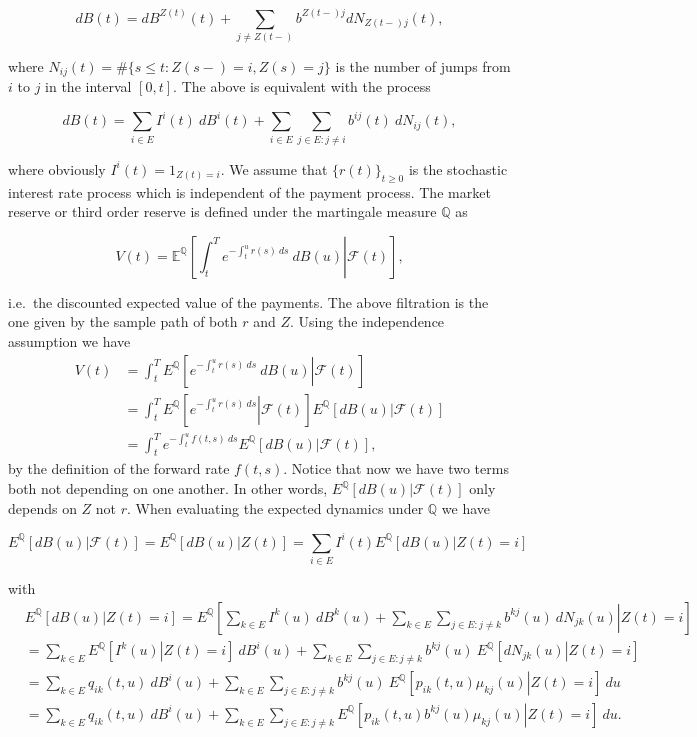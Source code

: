 \documentclass[a4paper,12pt,openany]{book}
\begin{document}
\[
dB(t)=dB^{Z(t)}(t)+\sum_{j\ne Z(t-)}b^{Z(t-)j}dN_{Z(t-)j}(t),
\]

where \(N_{ij}(t)=\#\{s\le t:Z(s-)=i,Z(s)=j\}\) is the number of jumps from \(i\) to \(j\)
in the interval \([0,t]\). The above is equivalent with the process

\[
dB(t)=\sum_{i\in E}I^i(t)\ dB^i(t)+\sum_{i\in E}\sum_{j\in E : j\ne i}b^{ij}(t)\ dN_{ij}(t),
\]

where obviously \(I^i(t)=1_{Z(t)=i}\). We assume that \(\{r(t)\}_{t\ge 0}\) is the stochastic interest rate process which is independent of the payment process. The market reserve or third order reserve is defined under the martingale measure \(\mathbb Q\) as

\[
V(t)=\mathbb E^{\mathbb Q}\left[\left.\int_t^Te^{-\int_t^ur(s)\ ds}\ dB(u)\right\vert \mathcal F(t)\right],
\]

i.e.~the discounted expected value of the payments. The above filtration is the one given by the sample path of both \(r\) and \(Z\). Using the independence assumption we have
\begin{align*}
V(t)&=\int_t^TE^{\mathbb Q}\left[\left.e^{-\int_t^ur(s)\ ds}\ dB(u)\right\vert \mathcal F(t)\right]\\
&=\int_t^TE^{\mathbb Q}\left[\left.e^{-\int_t^ur(s)\ ds}\right\vert \mathcal F(t)\right]E^{\mathbb Q}\left[\left.dB(u)\right\vert \mathcal F(t)\right]\\
&=\int_t^Te^{-\int_t^uf(t,s)\ ds}E^{\mathbb Q}\left[\left.dB(u)\right\vert \mathcal F(t)\right],
\end{align*}
by the definition of the forward rate \(f(t,s)\). Notice that now we have two terms both not depending on one another. In other words, \(E^{\mathbb Q}\left[\left.dB(u)\right\vert \mathcal F(t)\right]\) only depends on \(Z\) not \(r\). When evaluating the expected dynamics under \(\mathbb Q\) we have

\[
E^{\mathbb Q}\left[\left.dB(u)\right\vert \mathcal F(t)\right]=E^{\mathbb Q}\left[\left.dB(u)\right\vert Z(t)\right]=\sum_{i\in E}I^i(t)E^{\mathbb Q}\left[\left.dB(u)\right\vert Z(t)=i\right]
\]

with
\begin{align*}
&E^{\mathbb Q}\left[\left.dB(u)\right\vert Z(t)=i\right]=E^{\mathbb Q}\left[\left.\sum_{k\in E}I^k(u)\ dB^k(u)+\sum_{k\in E}\sum_{j\in E : j\ne k}b^{kj}(u)\ dN_{jk}(u)\right\vert Z(t)=i\right]\\
&=\sum_{k\in E}E^{\mathbb Q}\left[\left.I^k(u)\right\vert Z(t)=i\right]\ dB^i(u)+\sum_{k\in E}\sum_{j\in E : j\ne k}b^{kj}(u)\ E^{\mathbb Q}\left[\left.dN_{jk}(u)\right\vert Z(t)=i\right]\\
&=\sum_{k\in E}q_{ik}(t,u)\ dB^i(u)+\sum_{k\in E}\sum_{j\in E : j\ne k}b^{kj}(u)\ E^{\mathbb Q}\left[\left.p_{ik}(t,u)\mu_{kj}(u)\right\vert Z(t)=i\right]\ du\\
&=\sum_{k\in E}q_{ik}(t,u)\ dB^i(u)+\sum_{k\in E}\sum_{j\in E : j\ne k}E^{\mathbb Q}\left[\left.p_{ik}(t,u)b^{kj}(u)\mu_{kj}(u)\right\vert Z(t)=i\right]\ du.
\end{align*}
\end{document}
